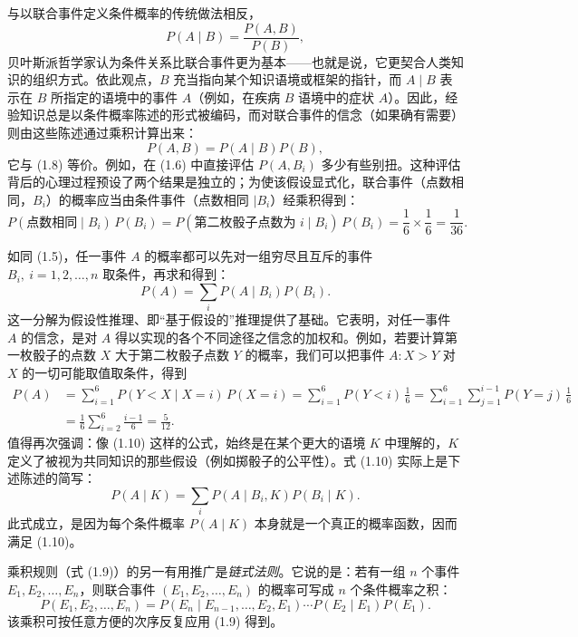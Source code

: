 与以联合事件定义条件概率的传统做法相反，
\begin{equation}
P(A\mid B) = \frac{P(A,B)}{P(B)}, \tag{1.8}
\end{equation}
贝叶斯派哲学家认为条件关系比联合事件更为基本——也就是说，它更契合人类知识的组织方式。依此观点，$B$ 充当指向某个知识语境或框架的指针，而 $A\mid B$ 表示在 $B$ 所指定的语境中的事件 $A$（例如，在疾病 $B$ 语境中的症状 $A$）。因此，经验知识总是以条件概率陈述的形式被编码，而对联合事件的信念（如果确有需要）则由这些陈述通过乘积计算出来：
\begin{equation}
P(A,B) = P(A\mid B)P(B), \tag{1.9}
\end{equation}
它与 \textup{(1.8)} 等价。例如，在 \textup{(1.6)} 中直接评估 $P(A,B_i)$ 多少有些别扭。这种评估背后的心理过程预设了两个结果是独立的；为使该假设显式化，联合事件（点数相同，$B_i$）的概率应当由条件事件（点数相同 $\mid B_i$）经乘积得到：
\[
P(\text{点数相同}\mid B_i)\,P(B_i) = P(\text{第二枚骰子点数为 } i\mid B_i)\,P(B_i) = \frac{1}{6}\times\frac{1}{6} = \frac{1}{36}.
\]

如同 \textup{(1.5)}，任一事件 $A$ 的概率都可以先对一组穷尽且互斥的事件 $B_i,\ i=1,2,\dots,n$ 取条件，再求和得到：
\begin{equation}
P(A) = \sum_i P(A\mid B_i)P(B_i). \tag{1.10}
\end{equation}
这一分解为假设性推理、即“基于假设的”推理提供了基础。它表明，对任一事件 $A$ 的信念，是对 $A$ 得以实现的各个不同途径之信念的加权和。例如，若要计算第一枚骰子的点数 $X$ 大于第二枚骰子点数 $Y$ 的概率，我们可以把事件 $A: X>Y$ 对 $X$ 的一切可能取值取条件，得到
\begin{equation}
\begin{aligned}
P(A) &= \sum_{i=1}^{6} P(Y<X \mid X=i)\,P(X=i)
= \sum_{i=1}^{6} P(Y<i)\,\frac{1}{6}
= \sum_{i=1}^{6}\sum_{j=1}^{i-1} P(Y=j)\,\frac{1}{6}\\
&= \frac{1}{6}\sum_{i=2}^{6}\frac{i-1}{6} = \frac{5}{12}.
\end{aligned} \tag{1.11}
\end{equation}
值得再次强调：像 \textup{(1.10)} 这样的公式，始终是在某个更大的语境 $K$ 中理解的，$K$ 定义了被视为共同知识的那些假设（例如掷骰子的公平性）。式 \textup{(1.10)} 实际上是下述陈述的简写：
\begin{equation}
P(A\mid K) = \sum_i P(A\mid B_i,K)P(B_i\mid K). \tag{1.12}
\end{equation}
此式成立，是因为每个条件概率 $P(A\mid K)$ 本身就是一个真正的概率函数，因而满足 \textup{(1.10)}。

乘积规则（式 \textup{(1.9)}）的另一有用推广是\emph{链式法则}。它说的是：若有一组 $n$ 个事件 $E_1,E_2,\dots,E_n$，则联合事件 $(E_1,E_2,\dots,E_n)$ 的概率可写成 $n$ 个条件概率之积：
\begin{equation}
P(E_1,E_2,\dots,E_n) = P(E_n \mid E_{n-1},\dots,E_2,E_1)\cdots P(E_2\mid E_1)P(E_1). \tag{1.13}
\end{equation}
该乘积可按任意方便的次序反复应用 \textup{(1.9)} 得到。

